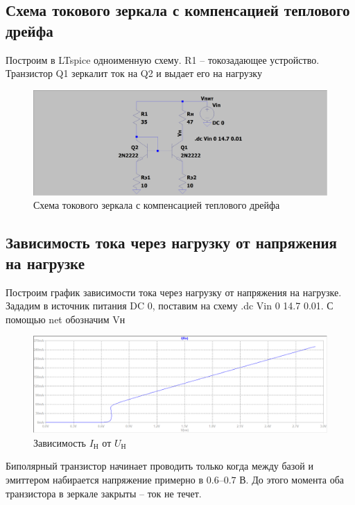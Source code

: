 \documentclass[a4paper, 12pt]{article}
\begin{document}
    \subsection{Схема токового зеркала с компенсацией теплового дрейфа}
    Построим в LTspice одноименную схему. R1 -- токозадающее устройство. Транзистор Q1 зеркалит ток на Q2
    и выдает его на нагрузку
    \begin{figure}[H]
        \centering
        \includegraphics[scale=0.22]{scheme1.png}
        \captionsetup{skip=0pt}
        \caption{Схема токового зеркала с компенсацией теплового дрейфа}
        \label{fig:scheme1}
    \end{figure}


    \subsection{Зависимость тока через нагрузку от напряжения на нагрузке}
    Построим график зависимости тока через нагрузку от напряжения на нагрузке.
    Зададим в источник питания DC 0, поставим на схему .dc Vin 0 14.7 0.01.
    С помощью net обозначим Vн
    \begin{figure}[H]
        \centering
        \includegraphics[scale=0.46]{1task_Iн(Vн).png}
        \captionsetup{skip=0pt}
        \caption{Зависимость $I_\text{Н}$ от $U_\text{Н}$}
        \label{fig:1task_InVn}
    \end{figure}
    \noindent Биполярный транзистор начинает проводить только когда между базой
    и эмиттером набирается напряжение примерно в $0.6$--$0.7$ В. До этого момента
    оба транзистора в зеркале закрыты -- ток не течет.
\end{document}
